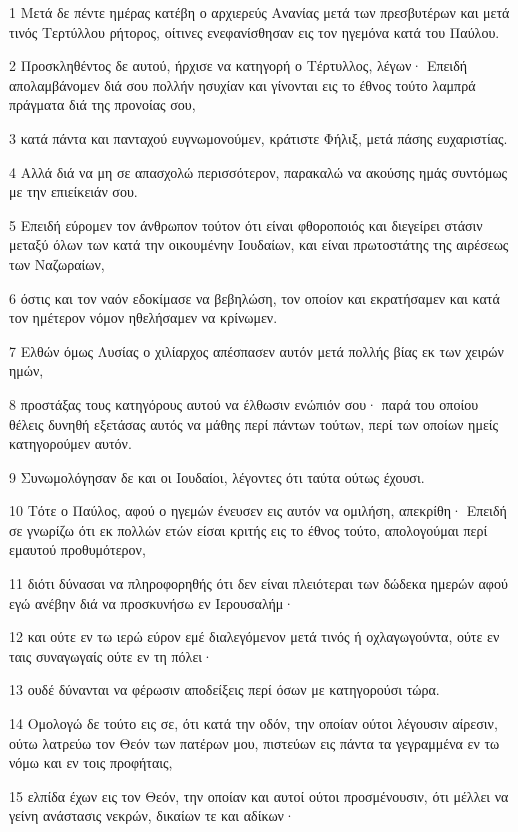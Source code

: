 \par 1 Μετά δε πέντε ημέρας κατέβη ο αρχιερεύς Ανανίας μετά των πρεσβυτέρων και μετά τινός Τερτύλλου ρήτορος, οίτινες ενεφανίσθησαν εις τον ηγεμόνα κατά του Παύλου.
\par 2 Προσκληθέντος δε αυτού, ήρχισε να κατηγορή ο Τέρτυλλος, λέγων· Επειδή απολαμβάνομεν διά σου πολλήν ησυχίαν και γίνονται εις το έθνος τούτο λαμπρά πράγματα διά της προνοίας σου,
\par 3 κατά πάντα και πανταχού ευγνωμονούμεν, κράτιστε Φήλιξ, μετά πάσης ευχαριστίας.
\par 4 Αλλά διά να μη σε απασχολώ περισσότερον, παρακαλώ να ακούσης ημάς συντόμως με την επιείκειάν σου.
\par 5 Επειδή εύρομεν τον άνθρωπον τούτον ότι είναι φθοροποιός και διεγείρει στάσιν μεταξύ όλων των κατά την οικουμένην Ιουδαίων, και είναι πρωτοστάτης της αιρέσεως των Ναζωραίων,
\par 6 όστις και τον ναόν εδοκίμασε να βεβηλώση, τον οποίον και εκρατήσαμεν και κατά τον ημέτερον νόμον ηθελήσαμεν να κρίνωμεν.
\par 7 Ελθών όμως Λυσίας ο χιλίαρχος απέσπασεν αυτόν μετά πολλής βίας εκ των χειρών ημών,
\par 8 προστάξας τους κατηγόρους αυτού να έλθωσιν ενώπιόν σου· παρά του οποίου θέλεις δυνηθή εξετάσας αυτός να μάθης περί πάντων τούτων, περί των οποίων ημείς κατηγορούμεν αυτόν.
\par 9 Συνωμολόγησαν δε και οι Ιουδαίοι, λέγοντες ότι ταύτα ούτως έχουσι.
\par 10 Τότε ο Παύλος, αφού ο ηγεμών ένευσεν εις αυτόν να ομιλήση, απεκρίθη· Επειδή σε γνωρίζω ότι εκ πολλών ετών είσαι κριτής εις το έθνος τούτο, απολογούμαι περί εμαυτού προθυμότερον,
\par 11 διότι δύνασαι να πληροφορηθής ότι δεν είναι πλειότεραι των δώδεκα ημερών αφού εγώ ανέβην διά να προσκυνήσω εν Ιερουσαλήμ·
\par 12 και ούτε εν τω ιερώ εύρον εμέ διαλεγόμενον μετά τινός ή οχλαγωγούντα, ούτε εν ταις συναγωγαίς ούτε εν τη πόλει·
\par 13 ουδέ δύνανται να φέρωσιν αποδείξεις περί όσων με κατηγορούσι τώρα.
\par 14 Ομολογώ δε τούτο εις σε, ότι κατά την οδόν, την οποίαν ούτοι λέγουσιν αίρεσιν, ούτω λατρεύω τον Θεόν των πατέρων μου, πιστεύων εις πάντα τα γεγραμμένα εν τω νόμω και εν τοις προφήταις,
\par 15 ελπίδα έχων εις τον Θεόν, την οποίαν και αυτοί ούτοι προσμένουσιν, ότι μέλλει να γείνη ανάστασις νεκρών, δικαίων τε και αδίκων·
